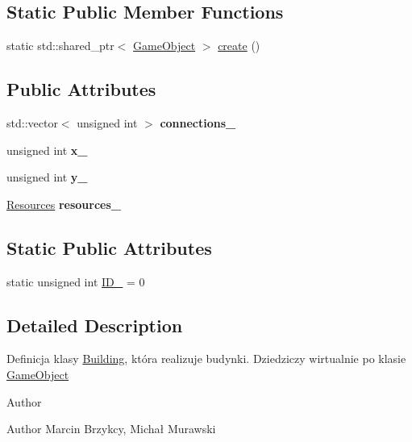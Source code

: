 \subsection*{Static Public Member Functions}
\begin{DoxyCompactItemize}
\item 
static std\+::shared\+\_\+ptr$<$ \hyperlink{classGameObject}{Game\+Object} $>$ \hyperlink{classMapPoint_ab60047cd652024faeeebb5286acd5eb2}{create} ()
\end{DoxyCompactItemize}
\subsection*{Public Attributes}
\begin{DoxyCompactItemize}
\item 
std\+::vector$<$ unsigned int $>$ {\bfseries connections\+\_\+}\hypertarget{classMapPoint_a4f0cab12abdeeb18753cbb4416a8fb37}{}\label{classMapPoint_a4f0cab12abdeeb18753cbb4416a8fb37}

\item 
unsigned int {\bfseries x\+\_\+}\hypertarget{classMapPoint_a1fa7c8a815156960b43952e123091533}{}\label{classMapPoint_a1fa7c8a815156960b43952e123091533}

\item 
unsigned int {\bfseries y\+\_\+}\hypertarget{classMapPoint_a37d68b5a84c43739ce77661d5f94cc35}{}\label{classMapPoint_a37d68b5a84c43739ce77661d5f94cc35}

\item 
\hyperlink{classResources}{Resources} {\bfseries resources\+\_\+}\hypertarget{classMapPoint_a9353037bd3a732910600e281dca0e6d1}{}\label{classMapPoint_a9353037bd3a732910600e281dca0e6d1}

\end{DoxyCompactItemize}
\subsection*{Static Public Attributes}
\begin{DoxyCompactItemize}
\item 
static unsigned int \hyperlink{classMapPoint_a0ec6add3c90e5cd5421de9f488d5e681}{I\+D\+\_\+} = 0
\end{DoxyCompactItemize}


\subsection{Detailed Description}
Definicja klasy \hyperlink{classBuilding}{Building}, która realizuje budynki. Dziedziczy wirtualnie po klasie \hyperlink{classGameObject}{Game\+Object} \begin{DoxyAuthor}{Author}

\end{DoxyAuthor}
\begin{DoxyParagraph}{Author}
Marcin Brzykcy, Michał Murawski 
\end{DoxyParagraph}


